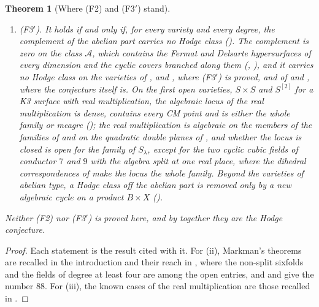 \documentclass[11pt,reqno]{amsart}
\theoremstyle{plain}
\newtheorem{theorem}{Theorem}[section]
\theoremstyle{definition}
\theoremstyle{remark}
\DeclareMathOperator{\Ext}{Ext}
\begin{document}
\begin{theorem}[Where (F2) and (F3$'$) stand]
\begin{enumerate}[label=\textup{(\roman*)},leftmargin=2.6em,itemsep=3pt]
  Mumford fourfolds, where the classes are algebraic at every CM point
  () and on every member once one Kuga--Satake class is
  algebraic (), or once one complex at one CM point has
  $\Ext^{2}$ of dimension $119$ (); on the
  square of a Mumford fourfold the two exceptional classes are algebraic
  exactly when one class on a product with an abelian sixfold is
  (the sixfold link of \cite{BB26dense}).
\item \emph{(F3$'$).} It holds if and only if, for every variety and every
  degree, the complement of the abelian part carries no Hodge class
  (). The complement is zero on the class $\mathcal{A}$,
  which contains the Fermat and Delsarte hypersurfaces of every dimension and
  the cyclic covers branched along them (,
  ), and it carries no Hodge class on the varieties of
  ,  and
  , where \textup{(F3$'$)} is proved, and of
   and , where the conjecture itself
  is.
  On the first open varieties, $S\times S$ and $S^{[2]}$ for a K3 surface
  with real multiplication, the algebraic locus of the real multiplication
  is dense, contains every CM point and is either the whole family or meagre
  (); the real multiplication is algebraic on the members
  of the families of \cite{vGS25} and on the quadratic double planes of
  \cite{Sch10}, and whether the locus is closed is open for the family of
  $S_{\lambda}$, except for the two cyclic cubic fields of conductor $7$
  and $9$ with the algebra split at one real place, where
  the dihedral correspondences of \cite{BB26dense} make the locus the
  whole family. Beyond the
  varieties of abelian type, a Hodge
  class off the abelian part is removed only by a new algebraic cycle on a
  product $B\times X$ ().
\end{enumerate}
Neither (F2) nor \textup{(F3$'$)} is proved here, and by 
together they are the Hodge conjecture.
\end{theorem}

\begin{proof}
Each statement is the result cited with it. For (ii), Markman's theorems are
recalled in the introduction and their reach in , where the
non-split sixfolds and the fields of degree at least four are among the open
entries, and \cite[Theorem~5.14]{paperII} and
\cite[Corollary~5.15]{paperII} give the number $88$. For (iii), the known cases of
the real multiplication are those recalled in .
\end{proof}
\end{document}
